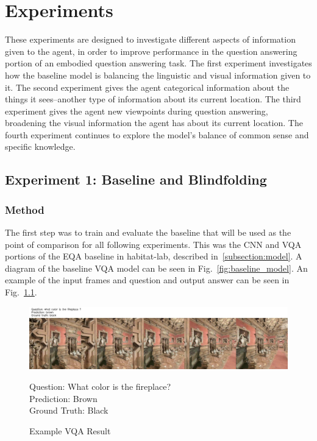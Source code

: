 \chapter{Experiments}
These experiments are designed to investigate different aspects of information given to the agent, in order to improve performance in the question answering portion of an embodied question answering task. The first experiment investigates how the baseline model is balancing the linguistic and visual information given to it. The second experiment gives the agent categorical information about the things it sees--another type of information about its current location. The third experiment gives the agent new viewpoints during question answering, broadening the visual information the agent has about its current location. The fourth experiment continues to explore the model's balance of common sense and specific knowledge. 

\section{Experiment 1: Baseline and Blindfolding}
\label{sec:exp_1}
\subsection{Method}
The first step was to train and evaluate the baseline that will be used as the point of comparison for all following experiments. This was the CNN and VQA portions of the EQA baseline in habitat-lab, described in~\ref{subsection:model}. A diagram of the baseline VQA model can be seen in Fig.~\ref{fig:baseline_model}. An example of the input frames and question and output answer can be seen in Fig.~\ref{fig:example_vqa_result}.\newline

\begin{figure}[H]
	\centering
        \includegraphics[width=\textwidth]{./figure/results/baseline_and_blindfolding/images/ckpt_23_781_image.jpg}
    \captionsetup{justification=raggedright, textfont=footnotesize}
	\caption*{Question: What color is the fireplace? \\
	Prediction: Brown \\
	Ground Truth: Black}
    \captionsetup{labelfont=bf, textfont=normal,
			justification=centering,
			singlelinecheck=false}	
	\caption{Example VQA Result} %
	\label{fig:example_vqa_result}
\end{figure}

